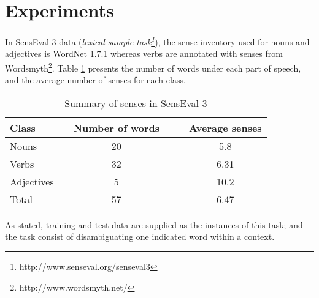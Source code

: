 \documentclass{llncs}
\begin{document}
\section{Experiments}
In SensEval-3 data (\textit{lexical sample task\footnote{http://www.senseval.org/senseval3}}), the sense inventory used for nouns and adjectives
is WordNet 1.7.1 \cite{miller1995wordnet} whereas verbs are annotated with senses from Wordsmyth\footnote{http://www.wordsmyth.net/}. Table \ref{table:SensEval-3-summary} presents the number of words under each part of speech, and the average number of senses for each class.
\begin{table}[]
	\centering
	\caption{Summary of senses in SensEval-3}
	\label{table:SensEval-3-summary}
	\begin{tabular}{@{}llcllc@{}}
		\toprule
		\textbf{Class}      &  & \textbf{Number of words} &  &  & \textbf{Average senses} \\ \midrule
		Nouns      &  & 20              &  &  & 5.8            \\
		Verbs      &  & 32              &  &  & 6.31           \\
		Adjectives &  & 5               &  &  & 10.2           \\ \midrule
		Total      &  & 57              &  &  & 6.47           \\ \bottomrule
	\end{tabular}
\end{table}

As stated, training and test data are supplied as the instances of this task; and the task consist of disambiguating one indicated word within a context.
 
\end{document}
